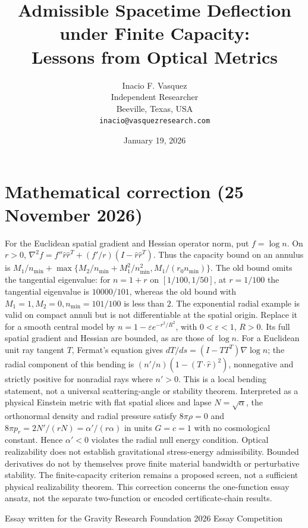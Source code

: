 \documentclass[11pt]{article}
\title{Admissible Spacetime Deflection under Finite Capacity:\\
Lessons from Optical Metrics}
\author{Inacio F. Vasquez\\
Independent Researcher\\
Beeville, Texas, USA\\
\texttt{inacio@vasquezresearch.com}}
\date{January 19, 2026}
\begin{document}
\maketitle
\section*{Mathematical correction (25 November 2026)}
For the Euclidean spatial gradient and Hessian operator norm, put $f=\log n$. On $r>0$, $\nabla^2f=f''\hat r\hat r^T+(f'/r)(I-\hat r\hat r^T)$. Thus the capacity bound on an annulus is $M_1/n_{\min}+\max\{M_2/n_{\min}+M_1^2/n_{\min}^2,M_1/(r_0n_{\min})\}$. The old bound omits the tangential eigenvalue: for $n=1+r$ on $[1/100,1/50]$, at $r=1/100$ the tangential eigenvalue is $10000/101$, whereas the old bound with $M_1=1,M_2=0,n_{\min}=101/100$ is less than $2$. The exponential radial example is valid on compact annuli but is not differentiable at the spatial origin. Replace it for a smooth central model by $n=1-\varepsilon e^{-r^2/R^2}$, with $0<\varepsilon<1$, $R>0$. Its full spatial gradient and Hessian are bounded, as are those of $\log n$. For a Euclidean unit ray tangent $T$, Fermat's equation gives $dT/ds=(I-TT^T)\nabla\log n$; the radial component of this bending is $(n'/n)(1-(T\cdot\hat r)^2)$, nonnegative and strictly positive for nonradial rays where $n'>0$. This is a local bending statement, not a universal scattering-angle or stability theorem. Interpreted as a physical Einstein metric with flat spatial slices and lapse $N=\sqrt{\alpha}$, the orthonormal density and radial pressure satisfy $8\pi\rho=0$ and $8\pi p_r=2N'/(rN)=\alpha'/(r\alpha)$ in units $G=c=1$ with no cosmological constant. Hence $\alpha'<0$ violates the radial null energy condition. Optical realizability does not establish gravitational stress-energy admissibility. Bounded derivatives do not by themselves prove finite material bandwidth or perturbative stability. The finite-capacity criterion remains a proposed screen, not a sufficient physical realizability theorem. This correction concerns the one-function essay ansatz, not the separate two-function or encoded certificate-chain results.



\begin{center}
Essay written for the Gravity Research Foundation 2026 Essay Competition
\end{center}
\end{document}
